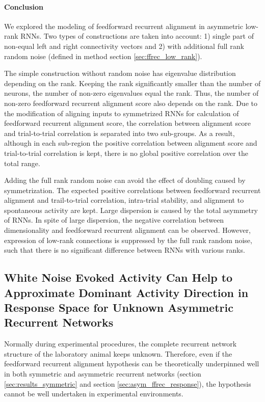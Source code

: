 \documentclass[11pt]{article}
\begin{document}
	
	\paragraph{Conclusion}
	We explored the modeling of feedforward recurrent alignment in asymmetric low-rank RNNs. Two types of constructions are taken into account: 1) single part of non-equal left and right connectivity vectors and 2) with additional full rank random noise (defined in method section \ref{sec:ffrec_low_rank}). 
	
	The simple construction without random noise has eigenvalue distribution depending on the rank. Keeping the rank significantly smaller than the number of neurons, the number of non-zero eigenvalues equal the rank. Thus, the number of non-zero feedforward recurrent alignment score also depends on the rank. Due to the modification of aligning inputs to symmetrized RNNs for calculation of feedforward recurrent alignment score, the correlation between alignment score and trial-to-trial correlation is separated into two sub-groups. As a result, although in each sub-region the positive correlation between alignment score and trial-to-trial correlation is kept, there is no global positive correlation over the total range. 
	
	Adding the full rank random noise can avoid the effect of doubling caused by symmetrization. The expected positive correlations between feedforward recurrent alignment and trail-to-trial correlation, intra-trial stability, and alignment to spontaneous activity are kept. Large dispersion is caused by the total asymmetry of RNNs. In spite of large dispersion, the negative correlation between dimensionality and feedforward recurrent alignment can be observed. However, expression of low-rank connections is suppressed by the full rank random noise, such that there is no significant difference between RNNs with various ranks. 
	
	\clearpage
	\subsection{White Noise Evoked Activity Can Help to Approximate Dominant Activity Direction in Response Space for Unknown Asymmetric Recurrent Networks}
	Normally during experimental procedures, the complete recurrent network structure of the laboratory animal keeps unknown. Therefore, even if the feedforward recurrent alignment hypothesis can be theoretically underpinned well in both symmetric and asymmetric recurrent networks (section \ref{sec:results_symmetric} and section \ref{sec:asym_ffrec_response}), the hypothesis cannot be well undertaken in experimental environments. 
	
\end{document}
